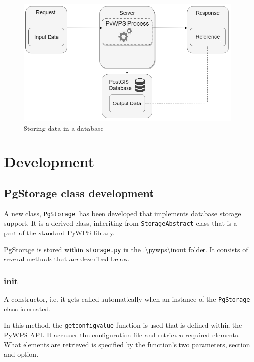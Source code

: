 \begin{figure}[H] \centering
      \includegraphics[width=350pt]{./pictures/newoption.png}
      \caption[Storing data in a database]{Storing data in a database}
      \label{fig:newoption}
  \end{figure}




\section{Development} 

\subsection{PgStorage class development} 

A new class, \texttt{PgStorage}, has been developed that implements database storage support. It is a derived class, inheriting from  \texttt{StorageAbstract} class that is a part of the standard PyWPS library. 

PgStorage is stored within \texttt{storage.py} in the .\textbackslash pywps\textbackslash inout folder. It consists of several methods that are described below. 

\subsubsection{\textunderscore \textunderscore init\textunderscore \textunderscore } 
A constructor, i.e. it gets called automatically when an instance of the \texttt{PgStorage} class is created. 

In this method, the \texttt{get\textunderscore config\textunderscore value}  function is used that is defined within the PyWPS API. It accesses the configuration file and retrieves required elements. What elements are retrieved is specified by the function's two parameters, section and option. 

